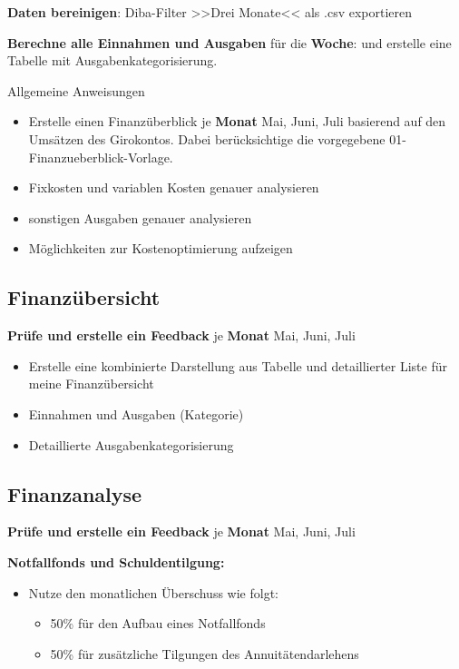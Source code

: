 \documentclass{vorlage-design-main}
\begin{document}
\textbf{Daten bereinigen}: Diba-Filter >>Drei Monate<< als .csv
exportieren

\textbf{Berechne alle Einnahmen und Ausgaben} für die \textbf{Woche}:
und erstelle eine Tabelle mit Ausgabenkategorisierung.

Allgemeine Anweisungen

\begin{itemize}

\item
  Erstelle einen Finanzüberblick je \textbf{Monat} Mai, Juni, Juli
  basierend auf den Umsätzen des Girokontos. Dabei berücksichtige die
  vorgegebene 01-Finanzueberblick-Vorlage.
\item
  Fixkosten und variablen Kosten genauer analysieren
\item
  sonstigen Ausgaben genauer analysieren
\item
  Möglichkeiten zur Kostenoptimierung aufzeigen
\end{itemize}

\subsection{Finanzübersicht}\label{finanzuebersicht}

\textbf{Prüfe und erstelle ein Feedback} je \textbf{Monat} Mai, Juni,
Juli

\begin{itemize}

\item
  Erstelle eine kombinierte Darstellung aus Tabelle und detaillierter
  Liste für meine Finanzübersicht
\item
  Einnahmen und Ausgaben (Kategorie)
\item
  Detaillierte Ausgabenkategorisierung
\end{itemize}

\subsection{Finanzanalyse}\label{finanzanalyse}

\textbf{Prüfe und erstelle ein Feedback} je \textbf{Monat} Mai, Juni,
Juli

\textbf{Notfallfonds und Schuldentilgung:}

\begin{itemize}

\item
  Nutze den monatlichen Überschuss wie folgt:

  \begin{itemize}

  \item
    50\% für den Aufbau eines Notfallfonds
  \item
    50\% für zusätzliche Tilgungen des Annuitätendarlehens
  \end{itemize}
\end{itemize}
\end{document}
